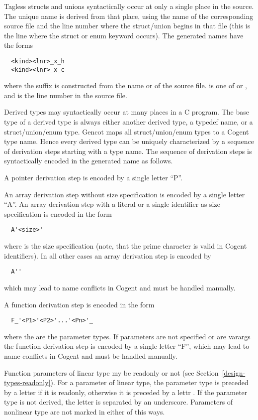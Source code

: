 Tagless structs and unions syntactically occur at only a single place in the source. The unique name is derived from 
that place, using the name of the corresponding source file and the line number where the struct/union begins
in that file (this is the line where the struct or enum keyword occurs).
The generated names have the forms
\begin{verbatim}
  <kind><lnr>_x_h
  <kind><lnr>_x_c
\end{verbatim}
where the suffix is constructed from the name  or  of the source file.  is one of
 or , and  is the line number in the source file.

Derived types may syntactically occur at many places in a C program. The base type of a derived
type is always either another derived type, a typedef name, or a struct/union/enum type. Gencot maps all
struct/union/enum types to a Cogent type name. Hence every derived type can be uniquely characterized by a sequence
of derivation steps starting with a type name. The sequence of derivation steps is syntactically encoded in the 
generated name as follows.

A pointer derivation step is encoded by a single letter ``P''. 

An array derivation step without size
specification is encoded by a single letter ``A''. An array derivation step with a literal or a single identifier
as size specification is encoded in the form
\begin{verbatim}
  A'<size>'
\end{verbatim}
where  is the size specification (note, that the prime character is valid in Cogent identifiers). 
In all other cases an array derivation step is encoded by
\begin{verbatim}
  A''
\end{verbatim}
which may lead to name conflicts in Cogent and must be handled manually.

A function derivation step is encoded in the form
\begin{verbatim}
  F_'<P1>'<P2>'...'<Pn>'_
\end{verbatim}
where the  are the parameter types. If parameters are not specified or are varargs the function
derivation step is encoded by a single letter ``F'', which may lead to name conflicts in Cogent and must 
be handled manually.

Function parameters of linear type my be readonly or not (see Section~\ref{design-types-readonly}). For a 
parameter of linear type, the parameter type  is preceded by a letter  if it is readonly,
otherwise it is preceded by a lettr . If the parameter type is not derived, the letter is separated
by an underscore. Parameters of nonlinear type are not marked in either of this ways.

